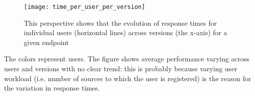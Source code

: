 \begin{figure}[h!]
  \centering
  \texttt{[image: time\_per\_user\_per\_version]}
  \caption{This perspective shows that the evolution of response times for individual users (horizontal lines) across versions (the x-axis) for a given endpoint}
  \label{fig:tuv}
\end{figure}


The colors represent users. The figure shows average performance varying  across users and versions with no clear trend: this is probably because varying user workload (i.e. number of sources to which the user is registered) is the reason for the variation in response times.  


  
